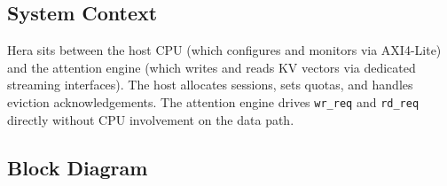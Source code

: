 \documentclass[10pt, a4paper]{article}
\newcommand{\portname}[1]{\texttt{#1}}
\begin{document}
\subsection{System Context}

Hera sits between the host CPU (which configures and monitors via AXI4-Lite)
and the attention engine (which writes and reads KV vectors via dedicated
streaming interfaces). The host allocates sessions, sets quotas, and handles
eviction acknowledgements. The attention engine drives \portname{wr\_req} and
\portname{rd\_req} directly without CPU involvement on the data path.

\subsection{Block Diagram}
\end{document}
